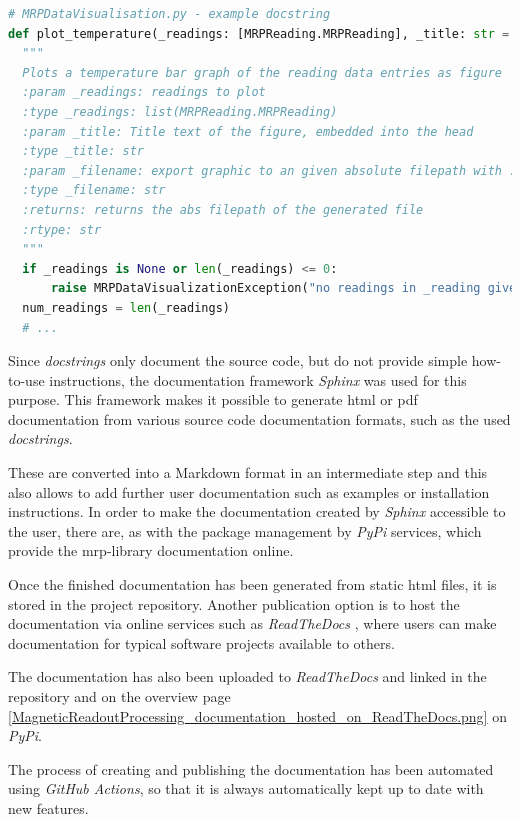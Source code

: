 \begin{lstlisting}[language=Python, caption={Documentation using Python docstring example}, label=lst:pydocstring]
# MRPDataVisualisation.py - example docstring
def plot_temperature(_readings: [MRPReading.MRPReading], _title: str = '', _filename: str = None, _unit: str = "degree C") -> str:
  """
  Plots a temperature bar graph of the reading data entries as figure
  :param _readings: readings to plot
  :type _readings: list(MRPReading.MRPReading)
  :param _title: Title text of the figure, embedded into the head
  :type _title: str
  :param _filename: export graphic to an given absolute filepath with .png
  :type _filename: str
  :returns: returns the abs filepath of the generated file
  :rtype: str
  """
  if _readings is None or len(_readings) <= 0:
      raise MRPDataVisualizationException("no readings in _reading given")
  num_readings = len(_readings)
  # ...
\end{lstlisting}

Since \emph{docstrings} only document the source code, but do not
provide simple how-to-use instructions, the documentation framework
\emph{Sphinx} \cite{SphinxDocumentation} was used for this purpose.
This framework makes it possible to generate \gls{html} or \gls{pdf}
documentation from various source code documentation formats, such as
the used \emph{docstrings}.

These are converted into a Markdown format in an intermediate step and
this also allows to add further user documentation such as examples or
installation instructions. In order to make the documentation created by
\emph{Sphinx} accessible to the user, there are, as with the package
management by \emph{PyPi} services, which provide the \gls{mrp}-library
documentation online.

Once the finished documentation has been generated from static
\gls{html} files, it is stored in the project repository. Another
publication option is to host the documentation via online services such
as \emph{ReadTheDocs} \cite{ReadTheDocs}, where users can make
documentation for typical software projects available to others.

The documentation has also been uploaded to \emph{ReadTheDocs}
\cite{MagneticReadoutProcessingReadTheDocs} and linked in the
repository and on the overview page
\ref{MagneticReadoutProcessing_documentation_hosted_on_ReadTheDocs.png}
on \emph{PyPi}.

The process of creating and publishing the documentation has been
automated using \emph{GitHub Actions}, so that it is always
automatically kept up to date with new features.

